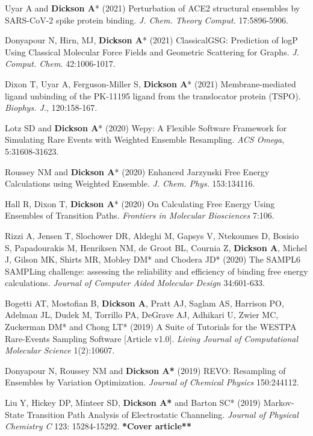 \documentclass[margin,line]{res}
\begin{document}
\begin{resume}
\begin{spacing}{1.2}
\begin{thebibliography}{10}
Uyar A and {\bf Dickson A}* (2021) Perturbation of ACE2 structural ensembles by SARS-CoV-2 spike protein binding.
\newblock \textit{J. Chem. Theory Comput.} 17:5896-5906.

Donyapour N, Hirn, MJ, {\bf Dickson A}* (2021) ClassicalGSG: Prediction of logP Using Classical Molecular Force Fields and Geometric Scattering for Graphs.
\newblock \textit{J. Comput. Chem.} 42:1006-1017.

Dixon T, Uyar A, Ferguson-Miller S, {\bf Dickson A}* (2021) Membrane-mediated ligand unbinding of the PK-11195 ligand from the translocator protein (TSPO).
\newblock \textit{Biophys. J.}, 120:158-167.

Lotz SD and {\bf Dickson A}* (2020) Wepy: A Flexible Software Framework for Simulating Rare Events with Weighted Ensemble Resampling.
\newblock \textit{ACS Omega}, 5:31608-31623.

Roussey NM and {\bf Dickson A}* (2020) Enhanced Jarzynski Free Energy Calculations using Weighted Ensemble.
\newblock \textit{J. Chem. Phys.} 153:134116.

Hall R, Dixon T, {\bf Dickson A}* (2020) On Calculating Free Energy Using Ensembles of Transition Paths. 
\newblock \textit{Frontiers in Molecular Biosciences} 7:106.

Rizzi A, Jensen T, Slochower DR, Aldeghi M, Gapsys V, Ntekoumes D, Bosisio S, Papadourakis M, Henriksen NM, de Groot BL, Cournia Z, {\bf Dickson A}, Michel J, Gilson MK, Shirts MR, Mobley DM* and Chodera JD* (2020) The SAMPL6 SAMPLing challenge: assessing the reliability and efficiency of binding free energy calculations. 
\newblock \textit{Journal of Computer Aided Molecular Design} 34:601-633.

  Bogetti AT, Mostofian B, {\bf Dickson A}, Pratt AJ, Saglam AS, Harrison PO, Adelman JL, Dudek M, Torrillo PA, DeGrave AJ, Adhikari U, Zwier MC, Zuckerman DM* and Chong LT* (2019) A Suite of Tutorials for the WESTPA Rare-Events Sampling Software [Article v1.0].
\newblock \textit{Living Journal of Computational Molecular Science} 1(2):10607.

  Donyapour N, Roussey NM and {\bf Dickson A*} (2019) REVO: Resampling of Ensembles by Variation Optimization.
  \newblock \textit{Journal of Chemical Physics} 150:244112.

  Liu Y, Hickey DP, Minteer SD, {\bf Dickson A*} and Barton SC* (2019) Markov-State Transition Path Analysis of Electrostatic Channeling.
  \newblock \textit{Journal of Physical Chemistry C} 123: 15284-15292. {\bf **Cover article**}


\end{thebibliography}
\end{spacing}
\end{resume}
\end{document}
